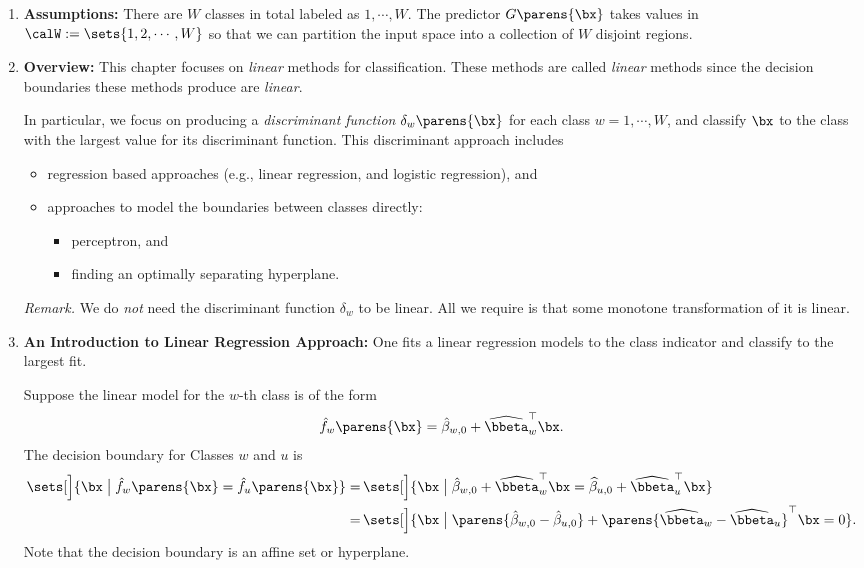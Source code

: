 \documentclass[12pt]{article}
\begin{document}
\begin{enumerate}[label=\textbf{\arabic*.}]
	
	\item \textbf{Assumptions:} There are $W$ classes in total labeled as $1, \cdots, W$. The predictor $G \parens{\bx}$ takes values in $\calW := \sets{1, 2, \cdots, W}$ so that we can partition the input space into a collection of $W$ disjoint regions. 
	
	\item \textbf{Overview:} This chapter focuses on \textit{linear} methods for classification. These methods are called \textit{linear} methods since the decision boundaries these methods produce are \textit{linear}. 
	
	In particular, we focus on producing a \emph{discriminant function} $\delta_w \parens{\bx}$ for each class $w = 1, \cdots, W$, and classify $\bx$ to the class with the largest value for its discriminant function. This discriminant approach includes 
	\begin{itemize}
		\item regression based approaches (e.g., linear regression, and logistic regression), and 
		\item approaches to model the boundaries between classes directly: 
		\begin{itemize} 
			\item perceptron, and 
			\item finding an optimally separating hyperplane. 
		\end{itemize}
	\end{itemize}
	
	\textit{Remark.} We do \emph{not} need the discriminant function $\delta_w$ to be linear. All we require is that some monotone transformation of it is linear. 
	
	\item \textbf{An Introduction to Linear Regression Approach:} One fits a linear regression models to the class indicator and classify to the largest fit. 
	
	Suppose the linear model for the $w$-th class is of the form 
	\begin{align*}
		\hat{f}_w \parens{\bx} = \hat{\beta}_{w,0} + \widehat{\bbeta}_w^\top \bx. 
	\end{align*}
	The decision boundary for Classes $w$ and $u$ is 
	\begin{align}
		\sets[\Big]{ \bx \bigm| \hat{f}_w \parens{\bx} = \hat{f}_{u} \parens{\bx} } = & \, \sets[\Big]{ \bx \bigm| \hat{\beta}_{w,0} + \widehat{\bbeta}_w^\top \bx = \widehat{\beta}_{u,0} + \widehat{\bbeta}_{u}^\top \bx } \nonumber \\ 
		= & \, \sets[\Big]{ \bx \bigm| \parens{\hat{\beta}_{w,0} - \hat{\beta}_{u,0}} + \parens{\widehat{\bbeta}_w - \widehat{\bbeta}_u}^\top \bx = 0 }. 
	\end{align}
	Note that the decision boundary is an affine set or hyperplane. 
	

\end{enumerate}
\end{document}
